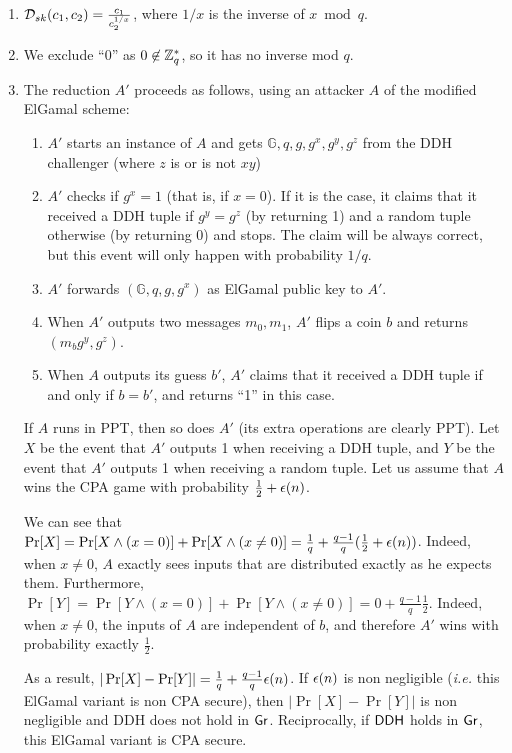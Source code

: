 \begin{solution}
	\begin{enumerate}
		\item	$\mathcal{D}_{sk}(c_1, c_2) = \frac{c_1}{c_2^{1/x}}$, where $1/x$ is the inverse of $x \bmod q$.
		\item We exclude ``0'' as  $0 \not \in \mathbb{Z}_q^*$, so it has no inverse mod $q$.
		\item The reduction $A'$ proceeds as follows, using an attacker $A$ of
		the modified ElGamal scheme:
		\begin{enumerate}
			\item $A'$ starts an instance of $A$ and gets
			$\mathbb{G}, q, g, g^x, g^y, g^z$ from the DDH challenger (where $z$
			is or is not $xy$)
			\item $A'$ checks if $g^x = 1$ (that is, if $x=0$). If it is the
			case, it claims that it received a DDH tuple if $g^y = g^z$ (by
			returning 1) and a random tuple otherwise (by returning 0) and
			stops. The claim will be always correct, but this event will only
			happen with probability $1/q$.
			\item $A'$ forwards $(\mathbb{G},q, g, g^x)$ as ElGamal public key
			to $A'$.
			\item When $A'$ outputs two messages $m_0, m_1$, $A'$ flips a coin
			$b$ and returns $(m_b g^y, g^z)$.
			\item When $A$ outputs its guess $b'$, $A'$ claims that it received
			a DDH tuple if and only if $b = b'$, and returns ``1'' in this case.
		\end{enumerate}
		If $A$ runs in PPT, then so does $A'$ (its extra operations are
		clearly PPT).
		Let $X$ be the event that $A'$ outputs 1 when receiving a DDH tuple,
		and $Y$ be the event that $A'$ outputs 1 when receiving a random
		tuple.
		Let us assume that $A$ wins the CPA
		game with probability $\frac 1 2 + \epsilon(n)$.

		We can see that
		$\Pr[X] = \Pr[X \wedge (x=0)] + \Pr[X \wedge (x\neq 0)] = \frac 1 q +
		\frac{q-1}{q}(\frac 1 2 + \epsilon(n))$.
		Indeed, when $x \neq 0$, $A$ exactly sees inputs that are
		distributed exactly as he expects them. Furthermore,
		$\Pr[Y] = \Pr[Y \wedge (x=0)] + \Pr[Y \wedge (x\neq 0)] = 0 +
		\frac{q-1}{q} \frac 1 2$.
		Indeed, when $x \neq 0$, the inputs of $A$ are independent of $b$, and
		therefore $A'$ wins with probability exactly $\frac 1 2$.

		As a result,
		$|\Pr[X] - \Pr[Y]| = \frac 1 q + \frac{q-1}{q}\epsilon(n) $. If $\epsilon(n)$ is non negligible (\textit{i.e.} this ElGamal variant is non CPA secure), then $|\Pr[X] - \Pr[Y]|$ is non negligible and DDH does not hold in $\operatorname{\mathsf{Gr}}$. Reciprocally, if $\mathsf{DDH}$ holds in $\operatorname{\mathsf{Gr}}$, this ElGamal variant is CPA secure.
	\end{enumerate}

\end{solution}
